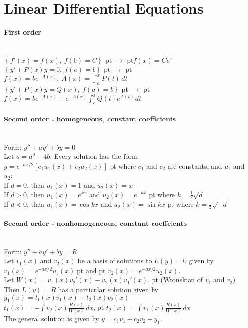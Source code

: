 \documentclass[10pt]{article}
\def\yields{\hskip 5 pt $\to$ \hskip 5 pt}
\begin{document}
\bigskip\bigskip
\section{Linear Differential Equations}\smallskip

\paragraph{First order}\ \\
$\left\{f'(x)=f(x),\ f(0)=C \right\}$ \yields $f(x)=Ce^x$\\
$\left\{y'+P(x)y=0,\ f(a)=b \right\}$ \yields $f(x)=be^{-A(x)},\ A(x)=\int_a^xP(t)\,dt$\\
$\left\{y'+P(x)y=Q(x),\ f(a)=b \right\}$ \yields $f(x)=be^{-A(x)}+e^{-A(x)}\int_a^xQ(t)e^{A(t)}\,dt$

\paragraph{Second order - homogeneous, constant coefficients}\ \\
Form: $y'' + ay' + by = 0$\\
Let $d = a^2-4b$. Every solution has the form:\\
$y=e^{-ax/2}[c_1u_1(x)+c_2u_2(x)]$  pt where $c_1$ and $c_2$ are constants, and $u_1$ and $u_2$:\\
If $d=0$, then $u_1(x)=1$ and $u_2(x)=x$\\
If $d>0$, then $u_1(x)=e^{kx}$ and $u_2(x)=e^{-kx}$  pt where $k=\frac{1}{2}\sqrt{d}$\\
If $d<0$, then $u_1(x)=\cos kx$ and $u_2(x)=\sin kx$  pt where $k=\frac{1}{2}\sqrt{-d}$

\paragraph{Second order - nonhomogeneous, constant coeffcients}\ \\
Form: $y'' + ay' + by = R$\\
Let $v_1(x)$ and $v_2(x)$ be a basis of solutions to $L(y)=0$ given by
$v_1(x)=e^{-ax/2}u_1(x)$  pt and  pt $v_2(x)=e^{-ax/2}u_2(x)$.\\
Let $W(x)=v_1(x)v_2'(x)-v_2(x)v_1'(x)$.  pt (Wronskian of $v_1$ and $v_2$)\\
Then $L(y)=R$ has a particular solution given by $y_1(x)=t_1(x)v_1(x)+t_2(x)v_2(x)$\\
$t_1(x)=-\int v_2(x)\frac{R(x)}{W(x)}\,dx$,  pt $t_2(x)=\int v_1(x)\frac{R(x)}{W(x)}\,dx$\\
The general solution is given by $y=c_1v_1+c_2v_2+y_1$.
\end{document}
